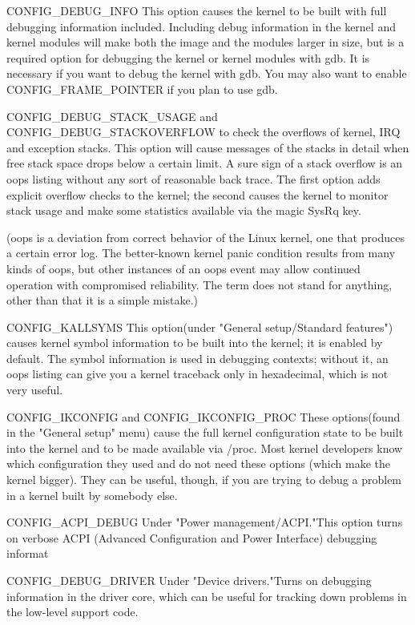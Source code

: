 \documentclass{masterthesis}
\begin{document}
CONFIG_DEBUG_INFO
This option causes the kernel to be built with full debugging information included. Including debug information in the kernel and kernel modules will make both the image and the modules larger in size, but is a required option for debugging the kernel or kernel modules with gdb.
It is necessary if you want to debug the kernel with gdb.
You may also want to enable CONFIG_FRAME_POINTER if you plan to use gdb.

 
CONFIG_DEBUG_STACK_USAGE and CONFIG_DEBUG_STACKOVERFLOW
to check the overflows of kernel, IRQ and exception stacks. This option will cause messages of the stacks in detail when free stack space drops below a certain limit.
A sure sign of a stack overflow is an oops listing without any sort of reasonable back trace. The first option adds explicit overflow checks to the kernel; the second causes the kernel to monitor stack usage and make some statistics available via the magic SysRq key.

(oops is a deviation from correct behavior of the Linux kernel, one that produces a certain error log. The better-known kernel panic condition results from many kinds of oops, but other instances of an oops event may allow continued operation with compromised reliability. The term does not stand for anything, other than that it is a simple mistake.)

CONFIG_KALLSYMS
This option(under "General setup/Standard features") causes kernel symbol information to be built into the kernel; it is enabled by default. The symbol information is used in debugging contexts; without it, an oops listing can give you a kernel traceback only in hexadecimal, which is not very useful.

CONFIG_IKCONFIG and CONFIG_IKCONFIG_PROC
These options(found in the "General setup" menu)  cause the full kernel configuration state to be built into the kernel and to be made available via /proc. Most kernel developers know which configuration they used and do not need these options (which make the kernel bigger). They can be useful, though, if you are trying to debug a problem in a kernel built by somebody else.

CONFIG_ACPI_DEBUG
Under "Power management/ACPI."This option turns on verbose ACPI (Advanced Configuration and Power Interface) debugging informat

CONFIG_DEBUG_DRIVER
Under "Device drivers."Turns on debugging information in the driver core, which can be useful for tracking down problems in the low-level support code. 
\end{document}
